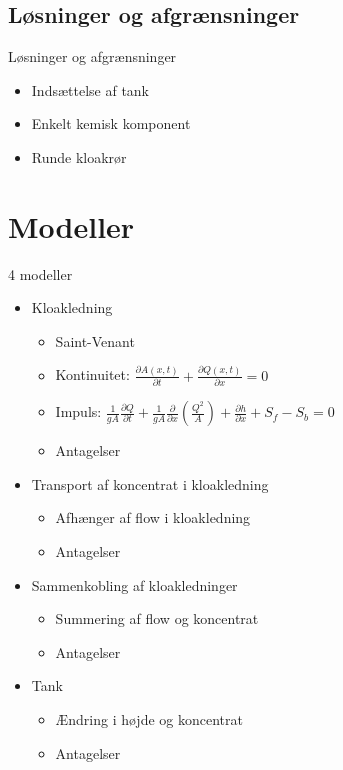 \subsection{Løsninger og afgrænsninger}
\begin{frame}{Løsninger og afgrænsninger}{}
\vfill\vfill\centering
\begin{itemize}
	\item<1-> Indsættelse af tank
	\vspace{4mm}
	\item<2-> Enkelt kemisk komponent
	\vspace{4mm}
	\item<3-> Runde kloakrør
\end{itemize}
\vfill\vfill	
\end{frame}

\section{Modeller}

\begin{frame}{4 modeller}{}
	\vfill\vfill\centering
\begin{itemize}
	\item<1-> Kloakledning
	\begin{itemize}
		\item<2-> Saint-Venant
		\item<2-> Kontinuitet: \hspace{15mm} $\frac{\partial A(x,t)}{\partial t} + \frac{\partial Q(x,t)}{\partial x}=0$ 
		\item<2-> Impuls: \hspace{21mm} $\frac{1}{gA} \frac{\partial Q}{\partial t} +\frac{1}{gA}\frac{\partial}{\partial x} \left( \frac{Q^2}{A} \right) + \frac{\partial h}{\partial x} + S_f - S_b = 0$
		\item<2-> Antagelser
	\end{itemize}
	\vspace{4mm}
	\item<1-> Transport af koncentrat i kloakledning
	\begin{itemize}
		\item<3-> Afhænger af flow i kloakledning
		\item<3-> Antagelser
	\end{itemize}
	\vspace{4mm}
	\item<1-> Sammenkobling af kloakledninger
	\begin{itemize}
		\item<4-> Summering af flow og koncentrat
		\item<4-> Antagelser
	\end{itemize}
	\vspace{4mm}
	\item<1-> Tank
	\begin{itemize}
		\item<5-> Ændring i højde og koncentrat
		\item<5-> Antagelser
	\end{itemize}	 
\end{itemize}
\vfill\vfill		
\end{frame}

